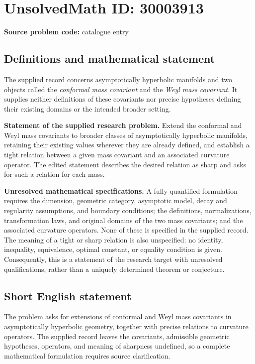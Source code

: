 \documentclass[11pt]{article}
\begin{document}
\section*{UnsolvedMath ID: 30003913}
\textbf{Source problem code:} catalogue entry
\subsection{Definitions and mathematical statement}
The supplied record concerns asymptotically hyperbolic manifolds and two objects called the \emph{conformal mass covariant} and the \emph{Weyl mass covariant}. It supplies neither definitions of these covariants nor precise hypotheses defining their existing domains or the intended broader setting.

\textbf{Statement of the supplied research problem.} Extend the conformal and Weyl mass covariants to broader classes of asymptotically hyperbolic manifolds, retaining their existing values wherever they are already defined, and establish a tight relation between a given mass covariant and an associated curvature operator. The edited statement describes the desired relation as sharp and asks for such a relation for each mass.

\textbf{Unresolved mathematical specifications.} A fully quantified formulation requires the dimension, geometric category, asymptotic model, decay and regularity assumptions, and boundary conditions; the definitions, normalizations, transformation laws, and original domains of the two mass covariants; and the associated curvature operators. None of these is specified in the supplied record. The meaning of a tight or sharp relation is also unspecified: no identity, inequality, equivalence, optimal constant, or equality condition is given. Consequently, this is a statement of the research target with unresolved qualifications, rather than a uniquely determined theorem or conjecture.
\subsection{Short English statement}
The problem asks for extensions of conformal and Weyl mass covariants in asymptotically hyperbolic geometry, together with precise relations to curvature operators. The supplied record leaves the covariants, admissible geometric hypotheses, operators, and meaning of sharpness undefined, so a complete mathematical formulation requires source clarification.
\end{document}
